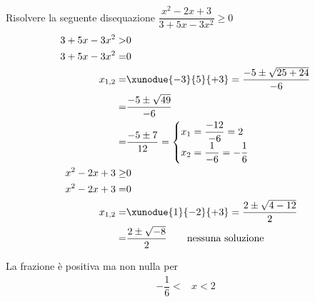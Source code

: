 Risolvere la seguente disequazione $\dfrac{x^2-2x+3}{3+5x-3x^2}\geq 0$
\begin{align*}
3+5x-3x^2>&0\\
3+5x-3x^2=&0\\
x_{1,2}=&\xunodue{-3}{5}{+3}=\dfrac{-5\pm\sqrt{25+24}}{-6}\\
=&\dfrac{-5\pm\sqrt{49}}{-6}\\
=&\dfrac{-5\pm 7}{12}=\begin{cases}
x_1=\dfrac{-12}{-6}=2\\
x_2=\dfrac{1}{-6}=-\dfrac{1}{6}
\end{cases}\\
x^2-2x+3\geq&0\\
x^2-2x+3=&0\\
x_{1,2}=&\xunodue{1}{-2}{+3}=\dfrac{2\pm\sqrt{4-12}}{2}\\
=&\dfrac{2\pm\sqrt{-8}}{2}
\qquad\text{nessuna soluzione}\\
\end{align*}
\begin{center}
	
\end{center}
La frazione è positiva ma non nulla per
\begin{align*}
-\dfrac{1}{6}<&x<2\\
\end{align*}
